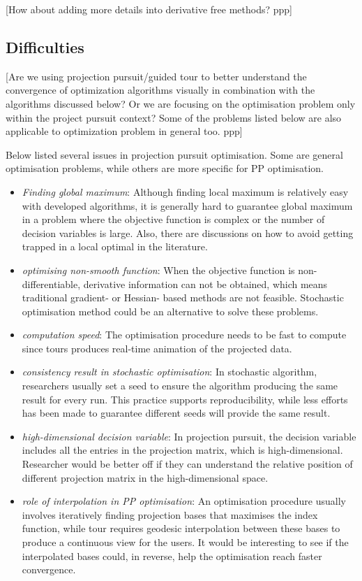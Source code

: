 \documentclass[12pt]{article}
\begin{document}
{[}How about adding more details into derivative free methods? ppp{]}

\hypertarget{difficulties}{%
\subsection{Difficulties}\label{difficulties}}

{[}Are we using projection pursuit/guided tour to better understand the
convergence of optimization algorithms visually in combination with the
algorithms discussed below? Or we are focusing on the optimisation
problem only within the project pursuit context? Some of the problems
listed below are also applicable to optimization problem in general too.
ppp{]}

Below listed several issues in projection pursuit optimisation. Some are
general optimisation problems, while others are more specific for PP
optimisation.

\begin{itemize}
\item
  \emph{Finding global maximum}: Although finding local maximum is
  relatively easy with developed algorithms, it is generally hard to
  guarantee global maximum in a problem where the objective function is
  complex or the number of decision variables is large. Also, there are
  discussions on how to avoid getting trapped in a local optimal in the
  literature.
\item
  \emph{optimising non-smooth function}: When the objective function is
  non-differentiable, derivative information can not be obtained, which
  means traditional gradient- or Hessian- based methods are not
  feasible. Stochastic optimisation method could be an alternative to
  solve these problems.
\item
  \emph{computation speed}: The optimisation procedure needs to be fast
  to compute since tours produces real-time animation of the projected
  data.
\item
  \emph{consistency result in stochastic optimisation}: In stochastic
  algorithm, researchers usually set a seed to ensure the algorithm
  producing the same result for every run. This practice supports
  reproducibility, while less efforts has been made to guarantee
  different seeds will provide the same result.
\item
  \emph{high-dimensional decision variable}: In projection pursuit, the
  decision variable includes all the entries in the projection matrix,
  which is high-dimensional. Researcher would be better off if they can
  understand the relative position of different projection matrix in the
  high-dimensional space.
\item
  \emph{role of interpolation in PP optimisation}: An optimisation
  procedure usually involves iteratively finding projection bases that
  maximises the index function, while tour requires geodesic
  interpolation between these bases to produce a continuous view for the
  users. It would be interesting to see if the interpolated bases could,
  in reverse, help the optimisation reach faster convergence.
\end{itemize}
\end{document}
